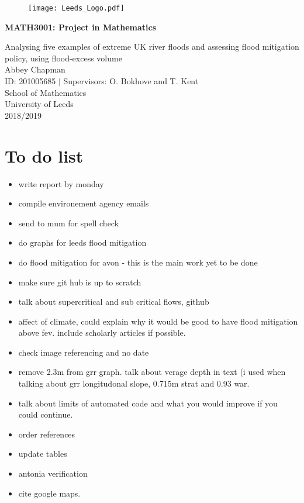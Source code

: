 \documentclass[11pt,a4paper]{article}
\begin{document}

\begin{titlepage}
\begin{center}

\begin{figure}[t]
\raggedleft
\texttt{[image: Leeds\_Logo.pdf]}
\end{figure}
 

\vspace*{5cm}
{\huge \textbf{MATH3001: Project in Mathematics}}\\
\hrulefill

\vspace*{0.1cm}
{\LARGE Analysing five examples of extreme UK river floods and assessing flood mitigation policy, using flood-excess volume}\\
\vspace{1cm}
{\large Abbey Chapman}\\
{\large ID: 201005685 $|$ Supervisors: O. Bokhove and T. Kent}\\
\vfill
School of Mathematics\\
University of Leeds\\
2018/2019
\end{center}
\end{titlepage}

\tableofcontents 
\noindent \hrulefill

\newpage
\section{To do list}
\begin{itemize}
\item write report by monday
\item compile environement agency emails
\item send to mum for spell check
\item do graphs for leeds flood mitigation
\item do flood mitigation for avon - this is the main work yet to be done
\item make sure git hub is up to scratch
\item talk about supercritical and sub critical flows, github
\item affect of climate, could explain why it would be good to have flood mitigation above fev. include scholarly articles if possible.
\item check image referencing and no date
\item remove 2.3m from grr graph. talk about verage depth in text (i used when talking about grr longitudonal slope, 0.715m strat and 0.93 war.
\item talk about limits of automated code and what you would improve if you could continue.
\item order references
\item update tables
\item antonia verification
\item cite google maps.
\end{itemize}
\end{document}
